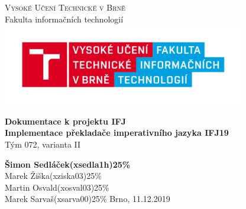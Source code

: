 \documentclass{article}
\begin{document}

	\begin{titlepage}
		\begin{center}
			\textsc{\Huge Vysoké Učení Technické v Brně} \\[0.7cm]
			{\Huge Fakulta informačních technologií}
			\center\includegraphics[width=0.5\linewidth]{./logo.png}

			\vspace{5cm}

			\textbf{{\Huge Dokumentace k projektu IFJ}}\\[0.4cm]
			\textbf{{\LARGE Implementace překladače imperativního jazyka IFJ19}}\\[0.4cm]
			\LARGE{Tým 072, varianta II}\\
			
		\end{center}
		\vfill

		\begin{flushleft}
			\begin{Large}
				\textbf{Šimon Sedláček}\hspace{10px}\textbf{(xsedla1h)}\hspace{10px}\textbf{25\% }\\[0.25cm]
				Marek Žiška\hspace{44px}(xziska03)\hspace{22px}25\%  \\[0.25cm]
				Martin Osvald\hspace{32px}(xosval03)\hspace{20px}25\% \\[0.25cm]
				Marek Sarvaš\hspace{37px}(xsarva00)\hspace{19px}25\% 
			\hfill
			Brno, 11.12.2019
			\end{Large}
		\end{flushleft}

	\end{titlepage}


	\tableofcontents
	\newpage
\end{document}
